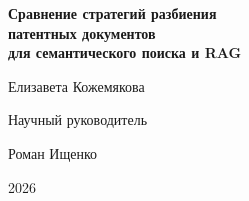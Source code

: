 \documentclass[aspectratio=169]{beamer}
\begin{document}
\begin{frame}[plain,t]
    \centering
    \vspace*{1.0cm}
    {\LARGE\bfseries Сравнение стратегий разбиения\\[3pt] патентных документов\\[3pt] для семантического поиска и RAG\par}

    \vspace{0.5cm}

    \vspace{0.7cm}
    {\Large Елизавета Кожемякова\par}

    \vspace{0.5cm}
    {\color{soft}\normalsize Научный руководитель\par}
    \vspace{2pt}
    {\large Роман Ищенко\par}

    \vspace{0.9cm}
    {\color{soft}\small 2026\par}
\end{frame}
\end{document}

